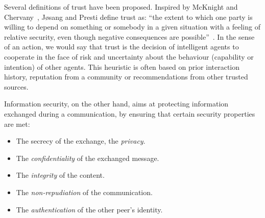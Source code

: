 

Several definitions of trust have been proposed.
Inspired by McKnight and Chervany~\cite{mcknight1996meanings}, J{\o}sang and Presti define trust as: ``the extent to which one party is willing to depend on something or somebody in a given situation with a feeling of relative security, even though negative consequences are possible''~\cite{josang2004analysing}.
In the sense of an action, we would say that trust is the decision of intelligent agents to cooperate in the face of risk and uncertainty about the behaviour (capability or intention) of other agents.
This heuristic is often based on prior interaction history, reputation from a community or recommendations from other trusted sources.
 
Information security, on the other hand, aims at protecting information exchanged during a communication, by ensuring that certain security properties are met:
\begin{itemize}
\item The secrecy of the exchange, \ie the \textit{privacy}.
\item The \textit{confidentiality} of the exchanged message.
\item The \textit{integrity} of the content.
\item The \textit{non-repudiation} of the communication.
\item The \textit{authentication} of the other peer's identity.
\end{itemize}

